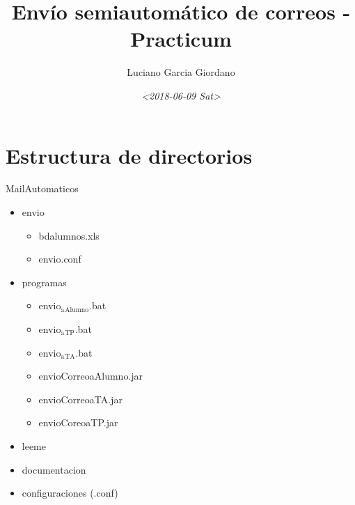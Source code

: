 \documentclass[11pt]{article}
\author{Luciano Garcia Giordano}
\date{\textit{<2018-06-09 Sat>}}
\title{Envío semiautomático de correos - Practicum}
\begin{document}
\maketitle
\tableofcontents


\section{Estructura de directorios}
\label{sec-1}
MailAutomaticos
\begin{itemize}
\item envio
\begin{itemize}
\item bdalumnos.xls
\item envio.conf
\end{itemize}
\item programas
\begin{itemize}
\item envio$_{\text{a}}$$_{\text{Alumno}}$.bat
\item envio$_{\text{a}}$$_{\text{TP}}$.bat
\item envio$_{\text{a}}$$_{\text{TA}}$.bat
\item envioCorreoaAlumno.jar
\item envioCorreoaTA.jar
\item envioCoreoaTP.jar
\end{itemize}
\item leeme
\item documentacion
\item configuraciones (.conf)
\end{itemize}
\end{document}
